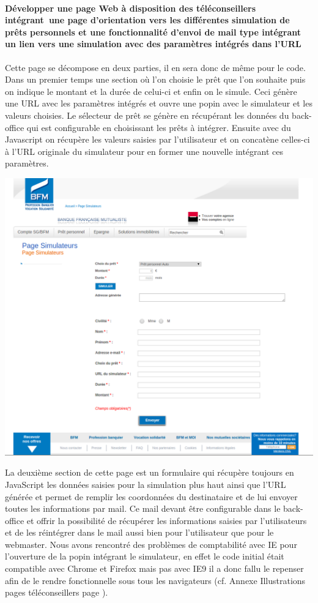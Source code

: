 \documentclass[a4paper,11pt,twoside]{report}
\begin{document}
      \paragraph*{Développer une page Web à disposition des téléconseillers intégrant une page d’orientation vers les différentes simulation de prêts personnels et une fonctionnalité d’envoi de mail type intégrant un lien vers une simulation avec des paramètres intégrés dans l’URL}
      Cette page se décompose en deux parties, il en sera donc de même pour le code. Dans un premier temps une section où l'on choisie le prêt que l'on souhaite puis on indique le montant et la durée de celui-ci et enfin on le simule. Ceci génère une URL avec les paramètres intégrés et ouvre une popin avec le simulateur et les valeurs choisies. Le sélecteur de prêt se génère en récupérant les données du back-office qui est configurable en choisissant les prêts à intégrer. Ensuite avec du Javascript on récupère les valeurs saisies par l'utilisateur et on concatène celles-ci à l'URL originale du simulateur pour en former une nouvelle intégrant ces paramètres. 
      \begin{center}
	\includegraphics[width=\textwidth]{images/page_teleconseille1.png}  
	\label{page_teleconseille_formulaire}
      \end{center}
      La deuxième section de cette page est un formulaire qui récupère toujours en JavaScript les données saisies pour la simulation plus haut ainsi que l'URL générée et permet de remplir les coordonnées du destinataire et de lui envoyer toutes les informations par mail. Ce mail devant être configurable dans le back-office et offrir la possibilité de récupérer les informations saisies par l'utilisateurs et de les réintégrer dans le mail aussi bien pour l'utilisateur que pour le webmaster. 
      Nous avons rencontré des problèmes de comptabilité avec IE pour l'ouverture de la popin intégrant le simulateur, en effet le code initial était compatible avec Chrome et Firefox mais pas avec IE9 il a donc fallu le repenser afin de le rendre fonctionnelle sous tous les navigateurs (cf. Annexe Illustrations pages téléconseillers page \pageref{illustrations_pages_teleconseillers}).
\end{document}
